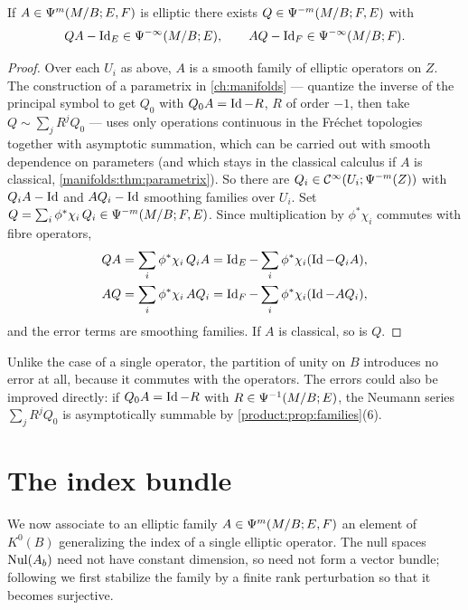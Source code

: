 \begin{proposition}\label{product:prop:family-parametrix}
If $A\in\Psi^{m}(M/B;E,F)$ is elliptic there exists $Q\in\Psi^{-m}(M/B;F,E)$
with
\begin{equation*}
QA-\operatorname{Id}_E\in\Psi^{-\infty}(M/B;E),\qquad AQ-\operatorname{Id}_F\in\Psi^{-\infty}(M/B;F).
\end{equation*}
\end{proposition}

\begin{proof}
Over each $U_i$ as above, $A$ is a smooth family of elliptic operators on $Z$.
The construction of a parametrix in \cref{ch:manifolds} --- quantize the inverse
of the principal symbol to get $Q_0$ with $Q_0A=\operatorname{Id}-R$, $R$ of order $-1$, then
take $Q\sim\sum_jR^jQ_0$ --- uses only operations continuous in the
Fréchet topologies together with asymptotic summation, which can be carried out
with smooth dependence on parameters (and which stays in the classical calculus if
$A$ is classical, \cref{manifolds:thm:parametrix}). So there are
$Q_i\in\mathcal{C}^\infty(U_i;\Psi^{-m}(Z))$
with $Q_iA-\operatorname{Id}$ and $AQ_i-\operatorname{Id}$ smoothing families over $U_i$. Set
$Q=\sum_i\phi^*\chi_i\,Q_i\in\Psi^{-m}(M/B;F,E)$. Since multiplication by
$\phi^*\chi_i$ commutes with fibre operators,
\begin{gather*}
QA=\sum_i\phi^*\chi_i\,Q_iA=\operatorname{Id}_E-\sum_i\phi^*\chi_i(\operatorname{Id}-Q_iA),\\
AQ=\sum_i\phi^*\chi_i\,AQ_i=\operatorname{Id}_F-\sum_i\phi^*\chi_i(\operatorname{Id}-AQ_i),
\end{gather*}
and the error terms are smoothing families. If $A$ is classical, so is $Q$.
\end{proof}

Unlike the case of a single operator, the partition of unity on $B$ introduces
no error at all, because it commutes with the operators. The errors could also
be improved directly: if $Q_0A=\operatorname{Id}-R$ with $R\in\Psi^{-1}(M/B;E)$, the Neumann
series $\sum_jR^jQ_0$ is asymptotically summable by
\cref{product:prop:families}(6).

\section{The index bundle}\label{product:sec:index-bundle}

We now associate to an elliptic family $A\in\Psi^{m}(M/B;E,F)$ an element of
$K^0(B)$ generalizing the index of a single elliptic operator. The null spaces
$\operatorname{Nul}(A_b)$ need not have constant dimension, so need not form a vector bundle;
following \cite{Atiyah-Singer-IV} we first stabilize the family by a finite rank
perturbation so that it becomes surjective.

